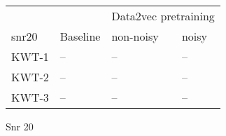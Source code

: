 \begin{table}[ht]
    
    \bigskip


    \begin{subtable}[ht]{0.45\textwidth}
        \centering
        \begin{tabular}{@{}llll@{}}
        \toprule
        & & \multicolumn{2}{c}{Data2vec pretraining} \\ \cline{3-4}
        snr20    & Baseline & non-noisy & noisy \\ \midrule
        KWT-1    & --  & -- & -- \\
        KWT-2    & --  & -- & -- \\
        KWT-3    & --  & -- & -- \\
        \bottomrule
        \end{tabular}
        \caption{Snr 20}
    \end{subtable}
    \caption{}
    \label{tab:test_more_noise}
\end{table}
